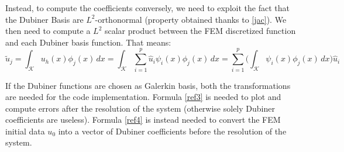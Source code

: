 \documentclass[a4paper,12pt]{article}
\begin{document}
	\noindent Instead, to compute the coefficients conversely, we need to exploit the fact that the Dubiner Basis are $L^2$-orthonormal (property obtained thanks to \ref{jac}). We then need to compute a $L^2$ scalar product between the FEM discretized function and each Dubiner basis function. That means:
	\begin{equation}\label{ref4}
	\tilde{u}_j = \int_\mathcal{K} u_h(x) \phi_j(x) \,dx = \int_{\mathcal{K}} \sum_{i=1}^p \hat{u}_i\psi_i(x) \phi_j(x) \,dx = \sum_{i=1}^p \Big(\int_{\mathcal{K}}\psi_i(x)\phi_j(x)\,dx \Big) \hat{u}_i
	\end{equation}
	
	\vspace{5mm}
	\noindent If the Dubiner functions are chosen as Galerkin basis, both the transformations are needed for the code implementation. Formula \ref{ref3} is needed to plot and compute errors after the resolution of the system (otherwise solely Dubiner coefficients are useless). Formula \ref{ref4} is instead needed to convert the FEM initial data $u_0$ into a vector of Dubiner coefficients before the resolution of the system.
	
\end{document}
